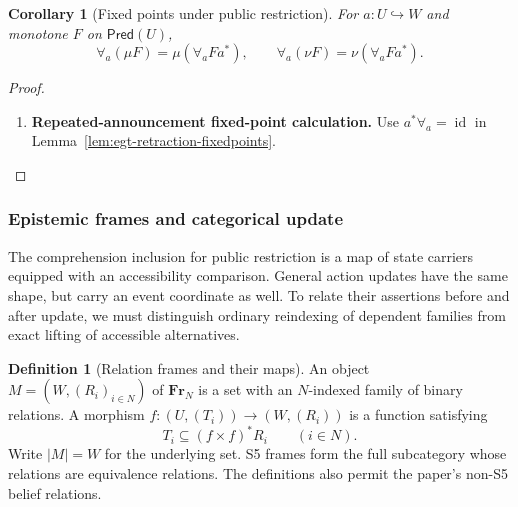 \documentclass[11pt,a4paper]{article}
\numberwithin{equation}{section}
\newtheorem{corollary}[theorem]{Corollary}
\theoremstyle{definition}
\newtheorem{definition}[theorem]{Definition}
\theoremstyle{remark}
\theoremstyle{plain}
\begin{document}
\begin{corollary}[Fixed points under public restriction]
\label{cor:egt-update-fixedpoints}
For $a:U\hookrightarrow W$ and monotone $F$ on $\mathsf{Pred}(U)$,
\[
 \forall_a(\mu F)=\mu(\forall_aFa^*),\qquad
 \forall_a(\nu F)=\nu(\forall_aFa^*).
\]
\end{corollary}
\begin{proof}
\leavevmode
\begin{enumerate}[label=\textup{(\arabic*)},leftmargin=*,itemsep=4pt,topsep=3pt]
  \item \textbf{Repeated-announcement fixed-point calculation.} Use $a^*\forall_a=\operatorname{id}$ in
Lemma~\ref{lem:egt-retraction-fixedpoints}.
\end{enumerate}
\end{proof}

\subsubsection{Epistemic frames and categorical update}
\label{sec:egt-frame-updates}

The comprehension inclusion for public restriction is a map of
state carriers equipped with an accessibility comparison. General action
updates have the same shape, but carry an event coordinate as well. To
relate their assertions before and after update, we must distinguish
ordinary reindexing of dependent families from exact lifting of
accessible alternatives.

\begin{definition}[Relation frames and their maps]
\label{def:egt-relation-frame-category}
An object $M=(W,(R_i)_{i\in N})$ of $\mathbf{Fr}_N$ is a set with an
$N$-indexed family of binary relations. A morphism
$f:(U,(T_i))\to(W,(R_i))$ is a function satisfying
\[
 T_i\subseteq(f\times f)^*R_i\qquad(i\in N).
\]
Write $|M|=W$ for the underlying set. S5 frames form the full subcategory
whose relations are equivalence relations. The definitions also permit the
paper's non-S5 belief relations.
\end{definition}
\end{document}
